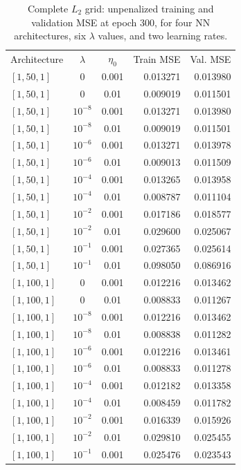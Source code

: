 \documentclass[aps,rmp,reprint,amsmath,amssymb,graphicx,longbibliography]{revtex4-1}
\begin{document}
\begin{table}[p]
\centering
\caption{Complete $L_2$ grid: unpenalized training and validation MSE
at epoch 300, for four NN architectures, six $\lambda$ values,
and two learning rates.}
\label{tab:partd_l2_full}
\scriptsize
\begin{ruledtabular}
\begin{tabular}{lccrr}
Architecture & $\lambda$ & $\eta_0$ & Train MSE & Val. MSE \\
$[1,50,1]$ & $0$ & 0.001 & 0.013271 & 0.013980 \\
$[1,50,1]$ & $0$ & 0.01 & 0.009019 & 0.011501 \\
$[1,50,1]$ & $10^{-8}$ & 0.001 & 0.013271 & 0.013980 \\
$[1,50,1]$ & $10^{-8}$ & 0.01 & 0.009019 & 0.011501 \\
$[1,50,1]$ & $10^{-6}$ & 0.001 & 0.013271 & 0.013978 \\
$[1,50,1]$ & $10^{-6}$ & 0.01 & 0.009013 & 0.011509 \\
$[1,50,1]$ & $10^{-4}$ & 0.001 & 0.013265 & 0.013958 \\
$[1,50,1]$ & $10^{-4}$ & 0.01 & 0.008787 & 0.011104 \\
$[1,50,1]$ & $10^{-2}$ & 0.001 & 0.017186 & 0.018577 \\
$[1,50,1]$ & $10^{-2}$ & 0.01 & 0.029600 & 0.025067 \\
$[1,50,1]$ & $10^{-1}$ & 0.001 & 0.027365 & 0.025614 \\
$[1,50,1]$ & $10^{-1}$ & 0.01 & 0.098050 & 0.086916 \\
$[1,100,1]$ & $0$ & 0.001 & 0.012216 & 0.013462 \\
$[1,100,1]$ & $0$ & 0.01 & 0.008833 & 0.011267 \\
$[1,100,1]$ & $10^{-8}$ & 0.001 & 0.012216 & 0.013462 \\
$[1,100,1]$ & $10^{-8}$ & 0.01 & 0.008838 & 0.011282 \\
$[1,100,1]$ & $10^{-6}$ & 0.001 & 0.012216 & 0.013461 \\
$[1,100,1]$ & $10^{-6}$ & 0.01 & 0.008833 & 0.011278 \\
$[1,100,1]$ & $10^{-4}$ & 0.001 & 0.012182 & 0.013358 \\
$[1,100,1]$ & $10^{-4}$ & 0.01 & 0.008459 & 0.011782 \\
$[1,100,1]$ & $10^{-2}$ & 0.001 & 0.016339 & 0.015926 \\
$[1,100,1]$ & $10^{-2}$ & 0.01 & 0.029810 & 0.025455 \\
$[1,100,1]$ & $10^{-1}$ & 0.001 & 0.025476 & 0.023543 \\

\end{tabular}
\end{ruledtabular}
\end{table}
\end{document}
